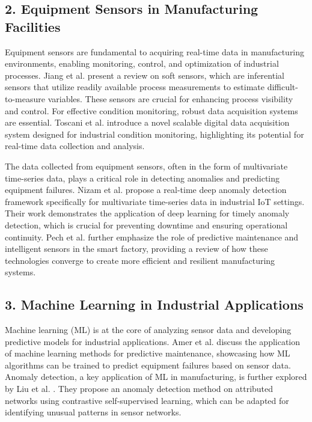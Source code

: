 \subsection*{2. Equipment Sensors in Manufacturing Facilities}

Equipment sensors are fundamental to acquiring real-time data in manufacturing environments, enabling monitoring, control, and optimization of industrial processes. Jiang et al. \cite{jiang-2020} present a review on soft sensors, which are inferential sensors that utilize readily available process measurements to estimate difficult-to-measure variables. These sensors are crucial for enhancing process visibility and control.  For effective condition monitoring, robust data acquisition systems are essential. Toscani et al. \cite{toscani-2023} introduce a novel scalable digital data acquisition system designed for industrial condition monitoring, highlighting its potential for real-time data collection and analysis.

The data collected from equipment sensors, often in the form of multivariate time-series data, plays a critical role in detecting anomalies and predicting equipment failures. Nizam et al. \cite{nizam-2022} propose a real-time deep anomaly detection framework specifically for multivariate time-series data in industrial IoT settings. Their work demonstrates the application of deep learning for timely anomaly detection, which is crucial for preventing downtime and ensuring operational continuity. Pech et al. \cite{pech-2021} further emphasize the role of predictive maintenance and intelligent sensors in the smart factory, providing a review of how these technologies converge to create more efficient and resilient manufacturing systems.

\subsection*{3. Machine Learning in Industrial Applications}

Machine learning (ML) is at the core of analyzing sensor data and developing predictive models for industrial applications. Amer et al. \cite{amer-2023} discuss the application of machine learning methods for predictive maintenance, showcasing how ML algorithms can be trained to predict equipment failures based on sensor data.  Anomaly detection, a key application of ML in manufacturing, is further explored by Liu et al. \cite{liu-2021}. They propose an anomaly detection method on attributed networks using contrastive self-supervised learning, which can be adapted for identifying unusual patterns in sensor networks.

